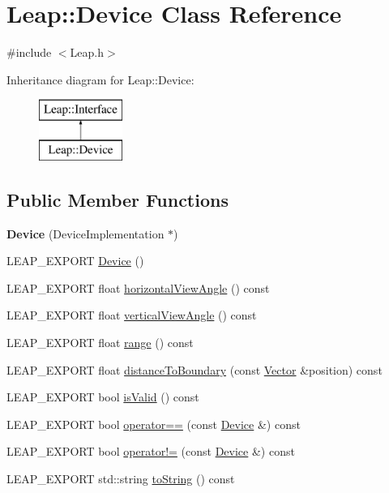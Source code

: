 \hypertarget{class_leap_1_1_device}{\section{Leap\+:\+:Device Class Reference}
\label{class_leap_1_1_device}
}


{\ttfamily \#include $<$Leap.\+h$>$}

Inheritance diagram for Leap\+:\+:Device\+:\begin{figure}[H]
\begin{center}
\leavevmode
\includegraphics[height=2.000000cm]{class_leap_1_1_device}
\end{center}
\end{figure}
\subsection*{Public Member Functions}
\begin{DoxyCompactItemize}
\item 
\hypertarget{class_leap_1_1_device_a7ec1c5a141f6b5de72846944fad60066}{{\bfseries Device} (Device\+Implementation $\ast$)}\label{class_leap_1_1_device_a7ec1c5a141f6b5de72846944fad60066}

\item 
L\+E\+A\+P\+\_\+\+E\+X\+P\+O\+R\+T \hyperlink{class_leap_1_1_device_ab14c21cd02a6773fa699980cb58032e2}{Device} ()
\item 
L\+E\+A\+P\+\_\+\+E\+X\+P\+O\+R\+T float \hyperlink{class_leap_1_1_device_a50aebd24cb616913c93776776bb34599}{horizontal\+View\+Angle} () const 
\item 
L\+E\+A\+P\+\_\+\+E\+X\+P\+O\+R\+T float \hyperlink{class_leap_1_1_device_a7d897c54bc650faf204fd2d2a1e8dfc5}{vertical\+View\+Angle} () const 
\item 
L\+E\+A\+P\+\_\+\+E\+X\+P\+O\+R\+T float \hyperlink{class_leap_1_1_device_a110a7177c29ccea229e554c488596a4d}{range} () const 
\item 
L\+E\+A\+P\+\_\+\+E\+X\+P\+O\+R\+T float \hyperlink{class_leap_1_1_device_a564bfe97e86eb5440093098d383cc5b2}{distance\+To\+Boundary} (const \hyperlink{struct_leap_1_1_vector}{Vector} \&position) const 
\item 
L\+E\+A\+P\+\_\+\+E\+X\+P\+O\+R\+T bool \hyperlink{class_leap_1_1_device_a26b77ec606519bb486e79d187bc8fae0}{is\+Valid} () const 
\item 
L\+E\+A\+P\+\_\+\+E\+X\+P\+O\+R\+T bool \hyperlink{class_leap_1_1_device_a20c6e9191d90de43b66def39d187e74e}{operator==} (const \hyperlink{class_leap_1_1_device}{Device} \&) const 
\item 
L\+E\+A\+P\+\_\+\+E\+X\+P\+O\+R\+T bool \hyperlink{class_leap_1_1_device_aa80064c6642078ab84652e4e984ec4fc}{operator!=} (const \hyperlink{class_leap_1_1_device}{Device} \&) const 
\item 
L\+E\+A\+P\+\_\+\+E\+X\+P\+O\+R\+T std\+::string \hyperlink{class_leap_1_1_device_ac498246027e86561a541178cc622761c}{to\+String} () const 
\end{DoxyCompactItemize}
